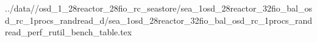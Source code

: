 ../data//osd_1_28reactor_28fio_rc_seastore/sea_1osd_28reactor_32fio_bal_osd_rc_1procs_randread_d/sea_1osd_28reactor_32fio_bal_osd_rc_1procs_randread_perf_rutil_bench_table.tex